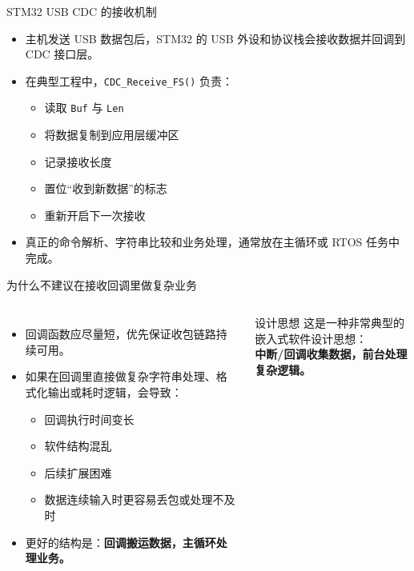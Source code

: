 \documentclass[11pt,aspectratio=169]{ctexbeamer}
\newcommand{\code}[1]{\texttt{#1}}
\newcommand{\term}[1]{\textbf{\color{PrimaryBlue}#1}}
\begin{document}
\begin{frame}{STM32 USB CDC 的接收机制}
  \small
  \begin{itemize}
    \item 主机发送 USB 数据包后，STM32 的 USB 外设和协议栈会接收数据并回调到 CDC 接口层。
    \item 在典型工程中，\code{CDC\_Receive\_FS()} 负责：
      \begin{itemize}
        \item 读取 \code{Buf} 与 \code{Len}
        \item 将数据复制到应用层缓冲区
        \item 记录接收长度
        \item 置位“收到新数据”的标志
        \item 重新开启下一次接收
      \end{itemize}
    \item 真正的命令解析、字符串比较和业务处理，通常放在主循环或 RTOS 任务中完成。
  \end{itemize}
\end{frame}

\begin{frame}{为什么不建议在接收回调里做复杂业务}
  \begin{columns}[T]
    \begin{itemize}
      \item 回调函数应尽量短，优先保证收包链路持续可用。
      \item 如果在回调里直接做复杂字符串处理、格式化输出或耗时逻辑，会导致：
        \begin{itemize}
          \item 回调执行时间变长
          \item 软件结构混乱
          \item 后续扩展困难
          \item 数据连续输入时更容易丢包或处理不及时
        \end{itemize}
      \item 更好的结构是：\term{回调搬运数据，主循环处理业务。}
    \end{itemize}

    \begin{alertblock}{设计思想}
      这是一种非常典型的嵌入式软件设计思想：\\[0.3em]
      \textbf{中断/回调收集数据，前台处理复杂逻辑。}
    \end{alertblock}
  \end{columns}
\end{frame}
\end{document}
